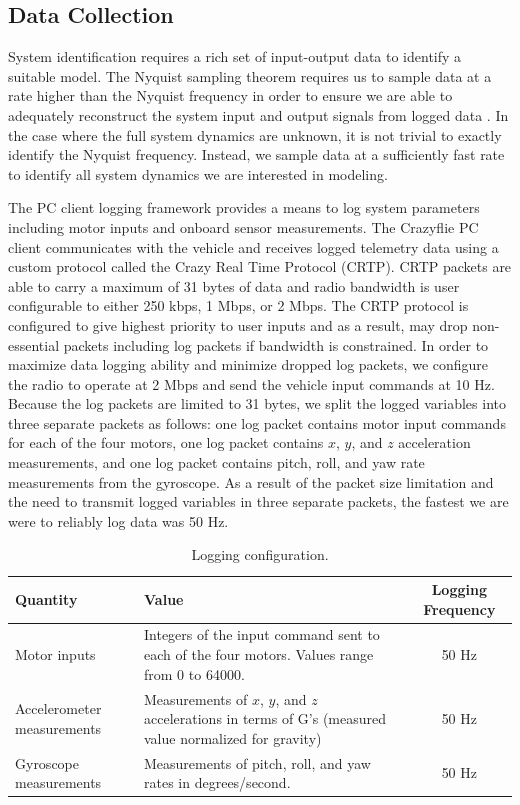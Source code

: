 \subsection{Data Collection}
System identification requires a rich set of input-output data to identify a suitable model. The Nyquist sampling theorem requires us to sample data at a rate higher than the Nyquist frequency in order to ensure we are able to adequately reconstruct the system input and output signals from logged data \cite{franklin1998digital}. In the case where the full system dynamics are unknown, it is not trivial to exactly identify the Nyquist frequency. Instead, we sample data at a sufficiently fast rate to identify all system dynamics we are interested in modeling. 

The PC client logging framework provides a means to log system parameters including motor inputs and onboard sensor measurements. The Crazyflie PC client communicates with the vehicle and receives logged telemetry data using a custom protocol called the Crazy Real Time Protocol (CRTP). CRTP packets are able to carry a maximum of 31 bytes of data and radio bandwidth is user configurable to either 250 kbps, 1 Mbps, or 2 Mbps. The CRTP protocol is configured to give highest priority to user inputs and as a result, may drop non-essential packets including log packets if bandwidth is constrained. In order to maximize data logging ability and minimize dropped log packets, we configure the radio to operate at 2 Mbps and send the vehicle input commands at 10 Hz. Because the log packets are limited to 31 bytes, we split the logged variables into three separate packets as follows: one log packet contains motor input commands for each of the four motors, one log packet contains $x$, $y$, and $z$ acceleration measurements, and one log packet contains pitch, roll, and yaw rate measurements from the gyroscope. As a result of the packet size limitation and the need to transmit logged variables in three separate packets, the fastest we are were to reliably log data was 50 Hz.
\begin{table}[!htb]
\centering
\caption{Logging configuration.}
\begin{tabular}{p{7em}p{17em}c}
\toprule
Quantity & Value & Logging Frequency\\
\midrule
Motor inputs & Integers of the input command sent to each of the four motors. Values range from 0 to 64000. & 50 Hz \\[5em]
Accelerometer measurements & Measurements of $x$, $y$, and $z$ accelerations in terms of G's (measured value normalized for gravity) & 50 Hz\\[3em]
Gyroscope \hspace{2em}measurements & Measurements of pitch, roll, and yaw rates in degrees/second. & 50 Hz\\
\bottomrule
\end{tabular}
\end{table}

